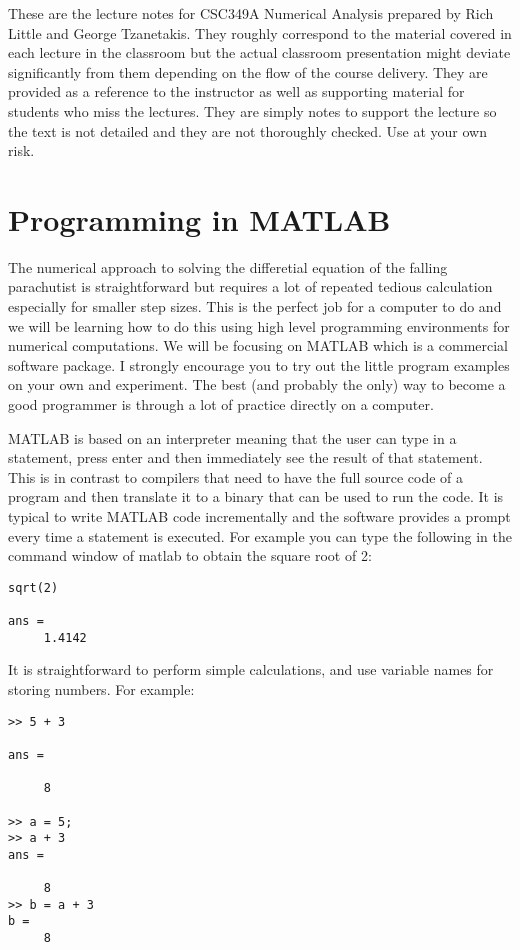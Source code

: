 \documentclass [titlepage,12pt,letter] {article}
\begin{document}
 


These are the lecture notes for CSC349A Numerical Analysis prepared by
Rich Little and George Tzanetakis. They roughly correspond to
the material covered in each lecture in the classroom but the actual
classroom presentation might deviate significantly from them depending
on the flow of the course delivery. They are provided as a reference to
the instructor as well as supporting material for students who miss
the lectures. They are simply notes to support the lecture so the text
is not detailed and they are not thoroughly checked. Use at your own
risk.



\section{Programming in MATLAB} 

The numerical approach to solving the differetial equation of the
falling parachutist is straightforward but requires a lot of repeated
tedious calculation especially for smaller step sizes. This is the
perfect job for a computer to do and we will be learning how to do
this using high level programming environments for numerical
computations.  We will be focusing on MATLAB which is a
commercial software package. I strongly encourage
you to try out the little program examples on your own and
experiment. The best (and probably the only) way to become a good
programmer is through a lot of practice directly on a computer. 

MATLAB is based on an interpreter meaning that the user can type
in a statement, press enter and then immediately see the result of
that statement. This is in contrast to compilers that need to have the
full source code of a program and then translate it to a binary that
can be used to run the code.  It is typical to write MATLAB code
incrementally and the software provides a prompt every time a
statement is executed. For example you can type the following in the
command window of matlab to obtain the square root of 2:

\begin{verbatim} 
sqrt(2) 

ans = 
     1.4142
\end{verbatim} 

It is straightforward to perform simple calculations, and use variable
names for storing numbers. For example: 

\begin{verbatim} 
>> 5 + 3 

ans =

     8

>> a = 5; 
>> a + 3
ans =

     8
>> b = a + 3 
b = 
     8
\end{verbatim} 
\end{document}
